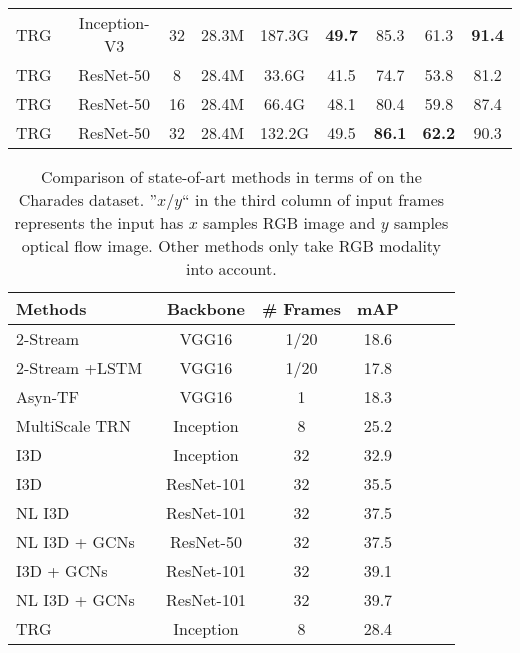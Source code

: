 \documentclass[conference,compsoc]{IEEEtran}
\begin{document}
\begin{table*}[!htb]
\begin{center}
\begin{tabular}{lcccccccc}
         TRG~ & Inception-V3 & 32 & 28.3M & 187.3G & \textbf{49.7} & 85.3 & 61.3  &\textbf{91.4}\\
         TRG~ & ResNet-50 & 8 & 28.4M & 33.6G & 41.5 & 74.7 & 53.8  &81.2\\
         TRG~ & ResNet-50 & 16 & 28.4M & 66.4G & 48.1 & 80.4 & 59.8  & 87.4\\
         TRG~ & ResNet-50 & 32 & 28.4M & 132.2G & 49.5 & \textbf{86.1} & \textbf{62.2}  & 90.3\\
         \bottomrule
        \end{tabular}
        \end{center}
        \vspace{-3mm}
        \label{tab:compare_smth}
    \end{table*}
    
    \begin{table}[!htb]
\caption{Comparison of state-of-art methods in terms of on the Charades dataset. ''$x/y$`` in the third column of input frames represents the input has $x$ samples RGB image and $y$ samples optical flow image. Other methods only take RGB modality into account.}
        \begin{center}
        \begin{tabular}{lcccccc}
        \toprule
         Methods & Backbone& \# Frames& mAP \\
         \midrule
         2-Stream~\cite{sigurdsson2017asynchronous} & VGG16 & 1/20 & 18.6 \\
         2-Stream +LSTM~\cite{sigurdsson2017asynchronous} & VGG16 & 1/20 & 17.8 \\
         Asyn-TF~\cite{sigurdsson2017asynchronous} & VGG16  & 1 & 18.3  \\
         MultiScale TRN~\cite{zhou2018temporal} & Inception & 8 & 25.2  \\
         I3D~\cite{carreira2017quo} & Inception & 32 & 32.9  \\
         I3D~\cite{wang2018non} & ResNet-101 & 32 & 35.5  \\
         NL I3D~\cite{wang2018non}  & ResNet-101  & 32 & 37.5  \\
         NL I3D + GCNs~\cite{wang2018videos} & ResNet-50 & 32 & 37.5  \\
         I3D + GCNs~\cite{wang2018videos} & ResNet-101 & 32 & 39.1  \\
         NL I3D + GCNs \cite{wang2018videos}  ~& ResNet-101 & 32 & 39.7   \\ \hline
         TRG~ & Inception & 8 & 28.4   \\

\end{tabular}
\end{center}
\end{table}
\end{document}
